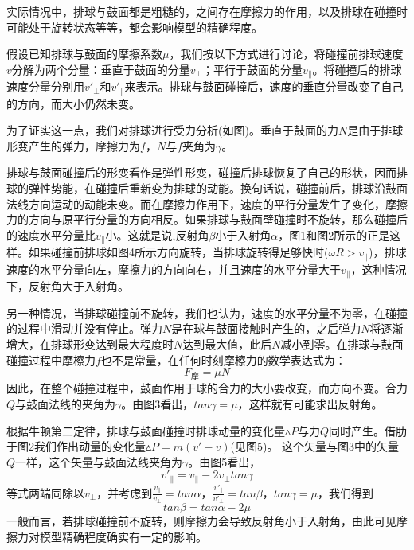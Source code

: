 \documentclass[withoutpreface,bwprint]{cumcmthesis} %
\begin{document}
实际情况中，排球与鼓面都是粗糙的，之间存在摩擦力的作用，以及排球在碰撞时可能处于旋转状态等等，都会影响模型的精确程度。

假设已知排球与鼓面的摩擦系数$\mu$，我们按以下方式进行讨论，将碰撞前排球速度$v$分解为两个分量：垂直于鼓面的分量$v_\bot$；平行于鼓面的分量$v_\parallel$。将碰撞后的排球速度分量分别用$v'_\bot$和$v'_\parallel$来表示。排球与鼓面碰撞后，速度的垂直分量改变了自己的方向，而大小仍然未变。

为了证实这一点，我们对排球进行受力分析(如图)。垂直于鼓面的力$N$是由于排球形变产生的弹力，摩擦力为$f$，$N$与$f$夹角为$\gamma$。

排球与鼓面碰撞后的形变看作是弹性形变，碰撞后排球恢复了自己的形状，因而排球的弹性势能，在碰撞后重新变为排球的动能。换句话说，碰撞前后，排球沿鼓面法线方向运动的动能未变。而在摩擦力作用下，速度的平行分量发生了变化，摩擦力的方向与原平行分量的方向相反。如果排球与鼓面壁碰撞时不旋转，那么碰撞后的速度水平分量比$v_\parallel$小。这就是说,反射角$\beta$小于入射角$\alpha$，图1和图2所示的正是这样。如果碰撞前排球如图4所示方向旋转，当排球旋转得足够快时($\omega R>v_\parallel$)，排球速度的水平分量向左，摩擦力的方向向右，并且速度的水平分量大于$v_\parallel$，这种情况下，反射角大于入射角。

另一种情况，当排球碰撞前不旋转，我们也认为，速度的水平分量不为零，在碰撞的过程中滑动并没有停止。弹力$N$是在球与鼓面接触时产生的，之后弹力$N$将逐渐增大，在排球形变达到最大程度时$N$达到最大值，此后$N$减小到零。在排球与鼓面碰撞过程中摩檫力$f$也不是常量，在任何时刻摩檫力的数学表达式为：
\begin{equation*}
	F_\textrm{摩}=\mu N
\end{equation*}
因此，在整个碰撞过程中，鼓面作用于球的合力的大小要改变，而方向不变。合力$Q$与鼓面法线的夹角为$\gamma$。由图3看出，$tan\gamma=\mu$，这样就有可能求出反射角。

根据牛顿第二定律，排球与鼓面碰撞时排球动量的变化量$\vartriangle P$与力$Q$同时产生。借肋于图2我们作出动量的变化量$\vartriangle P=m(v'-v)$(见图5)。
这个矢量与图3中的矢量$Q$一样，这个矢量与鼓面法线夹角为$\gamma$。由图5看出，
\begin{equation*}
	v'_\parallel=v_\parallel-2v_\bot tan\gamma
\end{equation*}
等式两端同除以$v_\bot$，并考虑到$\frac{v_\parallel}{v_\bot}=tan\alpha$，$\frac{v'_\parallel}{v'_\bot}=tan\beta$，$tan\gamma=\mu$，我们得到
\begin{equation*}
	tan\beta=tan\alpha-2\mu
\end{equation*}
一般而言，若排球碰撞前不旋转，则摩擦力会导致反射角小于入射角，由此可见摩擦力对模型精确程度确实有一定的影响。
\end{document}
